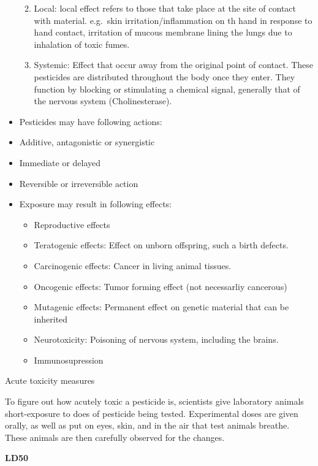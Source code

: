 \documentclass[
]{book}
\providecommand{\tightlist}{%
  \setlength{\itemsep}{0pt}\setlength{\parskip}{0pt}}
\begin{document}
\begin{itemize}
  \begin{enumerate}
  \def\labelenumi{\arabic{enumi}.}
  \tightlist
  \item
    Local: local effect refers to those that take place at the site of contact with material. e.g.~skin irritation/inflammation on th hand in response to hand contact, irritation of mucous membrane lining the lungs due to inhalation of toxic fumes.
  \item
    Systemic: Effect that occur away from the original point of contact. These pesticides are distributed throughout the body once they enter. They function by blocking or stimulating a chemical signal, generally that of the nervous system (Cholinesterase).
  \end{enumerate}
\item
  Pesticides may have following actions:
\item
  Additive, antagonistic or synergistic
\item
  Immediate or delayed
\item
  Reversible or irreversible action
\item
  Exposure may result in following effects:

  \begin{itemize}
  \tightlist
  \item
    Reproductive effects
  \item
    Teratogenic effects: Effect on unborn offspring, such a birth defects.
  \item
    Carcinogenic effects: Cancer in living animal tissues.
  \item
    Oncogenic effects: Tumor forming effect (not necessarliy cancerous)
  \item
    Mutagenic effects: Permanent effect on genetic material that can be inherited
  \item
    Neurotoxicity: Poisoning of nervous system, including the brains.
  \item
    Immunosupression
  \end{itemize}
\end{itemize}

Acute toxicity measures

To figure out how acutely toxic a pesticide is, scientists give laboratory animals short-exposure to does of pesticide being tested. Experimental doses are given orally, as well as put on eyes, skin, and in the air that test animals breathe. These animals are then carefully observed for the changes.

\textbf{LD50}
\end{document}
